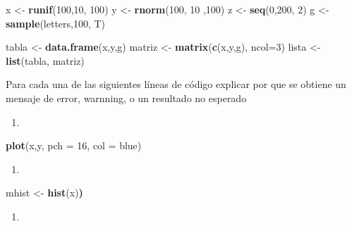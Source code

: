 \documentclass[]{book}
\newenvironment{Shaded}{\begin{snugshade}}{\end{snugshade}}
\newcommand{\DataTypeTok}[1]{\textcolor[rgb]{0.13,0.29,0.53}{#1}}
\newcommand{\DecValTok}[1]{\textcolor[rgb]{0.00,0.00,0.81}{#1}}
\newcommand{\ErrorTok}[1]{\textcolor[rgb]{0.64,0.00,0.00}{\textbf{#1}}}
\newcommand{\KeywordTok}[1]{\textcolor[rgb]{0.13,0.29,0.53}{\textbf{#1}}}
\newcommand{\NormalTok}[1]{#1}
\newcommand{\StringTok}[1]{\textcolor[rgb]{0.31,0.60,0.02}{#1}}
\begin{document}
\begin{Shaded}
\begin{Highlighting}[]
\NormalTok{    x <-}\StringTok{ }\KeywordTok{runif}\NormalTok{(}\DecValTok{100}\NormalTok{,}\DecValTok{10}\NormalTok{, }\DecValTok{100}\NormalTok{)}
\NormalTok{    y <-}\StringTok{ }\KeywordTok{rnorm}\NormalTok{(}\DecValTok{100}\NormalTok{, }\DecValTok{10}\NormalTok{ ,}\DecValTok{100}\NormalTok{)}
\NormalTok{    z <-}\StringTok{ }\KeywordTok{seq}\NormalTok{(}\DecValTok{0}\NormalTok{,}\DecValTok{200}\NormalTok{, }\DecValTok{2}\NormalTok{)}
\NormalTok{        g  <-}\StringTok{ }\KeywordTok{sample}\NormalTok{(letters,}\DecValTok{100}\NormalTok{, T)}

\NormalTok{        tabla <-}\StringTok{ }\KeywordTok{data.frame}\NormalTok{(x,y,g)}
\NormalTok{        matriz <-}\StringTok{ }\KeywordTok{matrix}\NormalTok{(}\KeywordTok{c}\NormalTok{(x,y,g), }\DataTypeTok{ncol=}\DecValTok{3}\NormalTok{)}
\NormalTok{        lista <-}\StringTok{ }\KeywordTok{list}\NormalTok{(tabla, matriz)}
\end{Highlighting}
\end{Shaded}

Para cada una de las siguientes líneas de código explicar por que se obtiene un mensaje de error, warnning, o un resultado no esperado

\begin{enumerate}
\def\labelenumi{\arabic{enumi}.}
\item
\end{enumerate}

\begin{Shaded}
\begin{Highlighting}[]
\KeywordTok{plot}\NormalTok{(x,y, }\DataTypeTok{pch =} \DecValTok{16}\NormalTok{, }\DataTypeTok{col =}\NormalTok{ blue)}
\end{Highlighting}
\end{Shaded}

\begin{enumerate}
\def\labelenumi{\arabic{enumi}.}
\setcounter{enumi}{1}
\item
\end{enumerate}

\begin{Shaded}
\begin{Highlighting}[]
\NormalTok{mhist <-}\StringTok{ }\KeywordTok{hist}\NormalTok{(x)}\ErrorTok{)}
\end{Highlighting}
\end{Shaded}

\begin{enumerate}
\def\labelenumi{\arabic{enumi}.}
\setcounter{enumi}{2}
\item
\end{enumerate}
\end{document}
